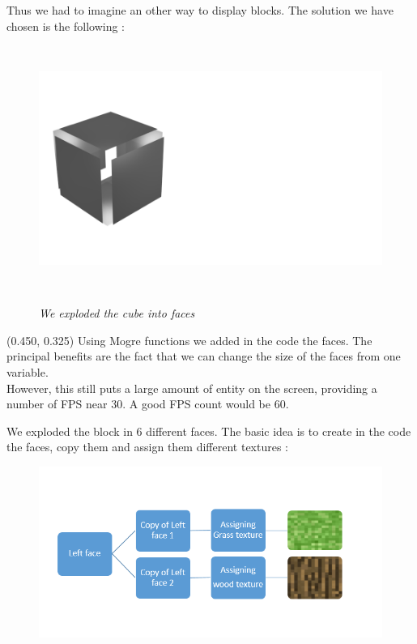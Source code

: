\documentclass[article]{report} %
\begin{document}
				Thus we had to imagine an other way to display blocks. The solution we have chosen is the following :
 				\begin{figure}[h]
					\includegraphics[width=16cm, height = 8cm]{Images/ExplodedCube.png}
					\begin{center}\it We exploded the cube into faces \end{center}
				\end{figure}
				\begin{textblock}{0.428}(0.450, 0.325)
					\noindent  Using Mogre functions we added in the code the faces. The principal benefits are the fact that we can change the size of the faces from one variable.\\

 However, this still puts a large amount of entity on the screen, providing a number of FPS near 30. A good FPS count would be 60.
			\end{textblock}
			
			We exploded the block in 6 different faces. The basic idea is to create in the code the faces, copy them and assign them different textures : 
			\begin{figure}[h]
					\includegraphics[scale=0.7]{Images/Display.png}
			\end{figure}
\end{document}
